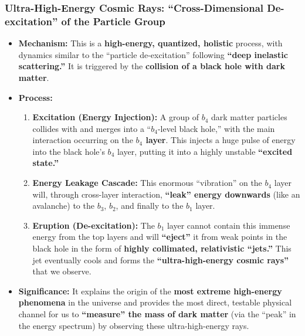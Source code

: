 \documentclass[11pt, a4paper]{article}
\begin{document}
\subsubsection{Ultra-High-Energy Cosmic Rays: ``Cross-Dimensional De-excitation'' of the Particle Group}
\begin{itemize}
    \item \textbf{Mechanism:} This is a \textbf{high-energy, quantized, holistic} process, with dynamics similar to the ``particle de-excitation'' following \textbf{``deep inelastic scattering.''} It is triggered by the \textbf{collision of a black hole with dark matter}.
    \item \textbf{Process:}
    \begin{enumerate}
        \item \textbf{Excitation (Energy Injection):} A group of $b_4$ dark matter particles collides with and merges into a ``$b_4$-level black hole,'' with the main interaction occurring on the \textbf{$b_4$ layer}. This injects a huge pulse of energy into the black hole's $b_4$ layer, putting it into a highly unstable \textbf{``excited state.''}
        \item \textbf{Energy Leakage Cascade:} This enormous ``vibration'' on the $b_4$ layer will, through cross-layer interaction, \textbf{``leak'' energy downwards} (like an avalanche) to the $b_3$, $b_2$, and finally to the $b_1$ layer.
        \item \textbf{Eruption (De-excitation):} The $b_1$ layer cannot contain this immense energy from the top layers and will \textbf{``eject''} it from weak points in the black hole in the form of \textbf{highly collimated, relativistic ``jets.''} This jet eventually cools and forms the \textbf{``ultra-high-energy cosmic rays''} that we observe.
    \end{enumerate}
    \item \textbf{Significance:} It explains the origin of the \textbf{most extreme high-energy phenomena} in the universe and provides the most direct, testable physical channel for us to \textbf{``measure'' the mass of dark matter} (via the ``peak'' in the energy spectrum) by observing these ultra-high-energy rays.
\end{itemize}
\end{document}
